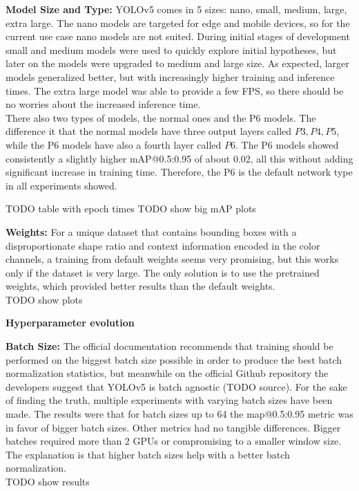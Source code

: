 \textbf{Model Size and Type:}
YOLOv5 comes in 5 sizes: nano, small, medium, large, extra large. The nano models are targeted for edge and mobile devices, so for the current use case nano models are not suited.
During initial stages of development small and medium models were used to quickly explore initial hypotheses, but later on the models were upgraded to medium and large size. As expected, larger models generalized better, but with increasingly higher training and inference times. The extra large model was able to provide a few FPS, so there should be no worries about the increased inference time. \\
There also two types of models, the normal ones and the P6 models. The difference it that the normal models have three output layers called $P3, P4, P5$, while the P6 models have also a fourth layer called $P6$. The P6 models showed consistently a slightly higher mAP@0.5:0.95 of about 0.02, all this without adding significant increase in training time. Therefore, the P6 is the default network type in all experiments showed.

TODO table with epoch times
TODO show big mAP plots

\textbf{Weights:}
For a unique dataset that contains bounding boxes with a disproportionate shape ratio and context information encoded in the color channels, a training from default weights seems very promising, but this works only if the dataset is very large. The only solution is to use the pretrained weights, which provided better results than the default weights.  \\
TODO show plots

\textbf{Hyperparameter evolution}

\textbf{Batch Size:}
The official documentation recommends that training should be performed on the biggest batch size possible in order to produce the best batch normalization statistics, but meanwhile on the official Github repository the developers suggest that YOLOv5 is batch agnostic (TODO source). For the sake of finding the truth, multiple experiments with varying batch sizes have been made. The results were that for batch sizes up to 64 the map@0.5:0.95 metric was in favor of bigger batch sizes. Other metrics had no tangible differences. Bigger batches required more than 2 GPUs or compromising to a smaller window size.
The explanation is that higher batch sizes help with a better batch normalization. \\
TODO show results \\

